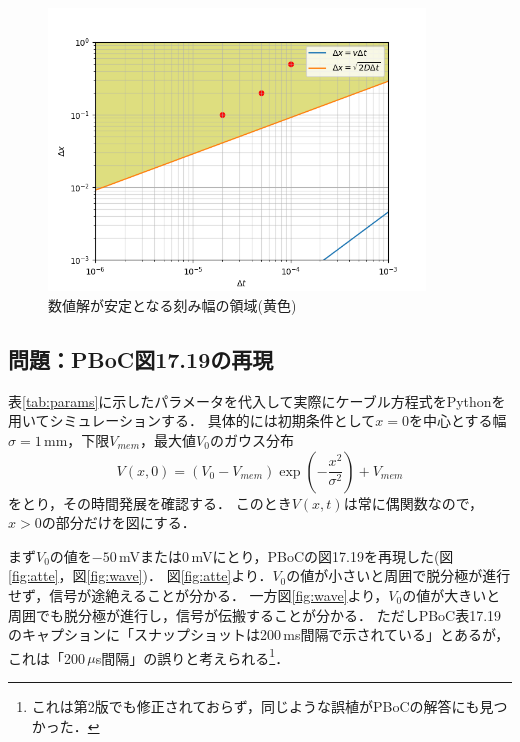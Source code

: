 \documentclass[a4paper,11pt]{jsarticle}
\begin{document}
\begin{figure}[htbp]
  \centering
  \includegraphics[width=10cm]{delta.png}
  \caption{数値解が安定となる刻み幅の領域(黄色)}
  \label{fig:delta}
\end{figure}

\subsection{問題：PBoC図17.19の再現}
表\ref{tab:params}に示したパラメータを代入して実際にケーブル方程式をPythonを用いてシミュレーションする．
具体的には初期条件として$x=0$を中心とする幅$\sigma=1$\,mm，下限$V_{mem}$，最大値$V_0$のガウス分布
\begin{equation}
  V(x,0) = (V_0 - V_{mem})\exp\left(-\frac{x^2}{\sigma^2} \right) + V_{mem}
\end{equation}
をとり，その時間発展を確認する．
このとき$V(x,t)$は常に偶関数なので，$x>0$の部分だけを図にする．

まず$V_0$の値を$-50$\,mVまたは$0$\,mVにとり，PBoCの図17.19を再現した(図\ref{fig:atte}，図\ref{fig:wave})．
図\ref{fig:atte}より．$V_0$の値が小さいと周囲で脱分極が進行せず，信号が途絶えることが分かる．
一方図\ref{fig:wave}より，$V_0$の値が大きいと周囲でも脱分極が進行し，信号が伝搬することが分かる．
ただしPBoC表17.19のキャプションに「スナップショットは200\,ms間隔で示されている」とあるが，これは「200\,$\mu$s間隔」の誤りと考えられる\footnote{これは第2版でも修正されておらず，同じような誤植がPBoCの解答にも見つかった．}．

\end{document}

